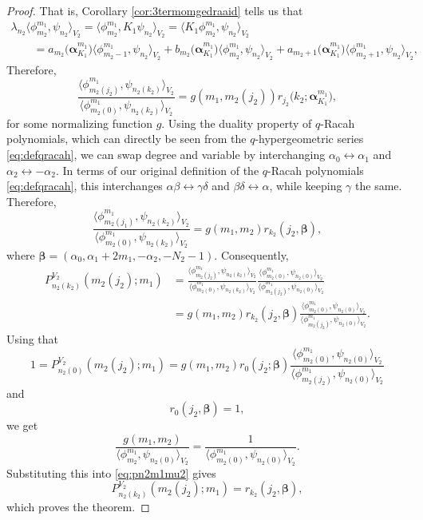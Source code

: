 \documentclass[10pt,a4paper]{amsart}
\numberwithin{equation}{section}
\begin{document}
\begin{proof}
	That is, Corollary \ref{cor:3termomgedraaid} tells us that
	\begin{gather*}
		\lambda_{n_2} \big\langle \phi_{m_2}^{m_1},\psi_{n_2}\big\rangle _{V_2} = \big\langle \phi_{m_2}^{m_1},K_1\psi_{n_2}\big\rangle _{V_2} = \big\langle K_1\phi_{m_2}^{m_1},\psi_{n_2}\big\rangle _{V_2} \\
		\qquad{} =a_{m_2}\big(\bm{\alpha}_{K_1}^{m_1}\big)\big\langle \phi_{m_2-1}^{m_1},\psi_{n_2}\big\rangle _{V_2}+b_{m_2}\big(\bm{\alpha}_{K_1}^{m_1}\big) \big\langle \phi_{m_2}^{m_1},\psi_{n_2}\big\rangle _{V_2}+a_{m_2+1}\big(\bm{\alpha}_{K_1}^{m_1}\big)\big\langle \phi_{m_2+1}^{m_1},\psi_{n_2}\big\rangle _{V_2},
	\end{gather*}
	Therefore,
	\[
	\frac{\big\langle \phi_{m_2(j_2)}^{m_1}, \psi_{n_2(k_2)}\big\rangle _{ V_2}}{\big\langle \phi_{m_2(0)}^{m_1}, \psi_{n_2(k_2)}\big\rangle _{ V_2}}=g(m_1,m_2(j_2))r_{j_2}\big(k_2;\bm{\alpha}_{K_1}^{m_1}\big),
	\]
for some normalizing function $g$. Using the duality property of $q$-Racah polynomials, which can directly be seen from the $q$-hypergeometric series \eqref{eq:defqracah}, we can swap degree and variable by interchanging $\alpha_0\leftrightarrow\alpha_1$ and $\alpha_2\leftrightarrow-\alpha_2$. In terms of our original definition of the $q$-Racah polynomials \eqref{eq:defqracah}, this interchanges $\alpha\beta\leftrightarrow\gamma\delta$ and $\beta\delta\leftrightarrow\alpha$, while keeping $\gamma$ the same. Therefore,
	\[
	\frac{\big\langle \phi_{m_2(j_1)}^{m_1}, \psi_{n_2(k_2)}\big\rangle _{ V_2}}{\big\langle \phi_{m_2(0)}^{m_1}, \psi_{n_2(k_2)}\big\rangle _{ V_2}}=g(m_1,m_2)r_{k_2}(j_2,\bm{\beta}),
	\]
	where $\bm{\beta}=(\alpha_0,\alpha_1+2m_1,-\alpha_2,-N_2-1)$. Consequently,
	\begin{align}
		P_{n_2(k_2)}^{V_2}(m_2(j_2);m_1)& = \frac{\big\langle \phi_{m_2(j_2)}^{m_1},\psi_{n_2(k_2)}\big\rangle _{ V_2}}{\big\langle \phi_{m_2(0)}^{m_1}, \psi_{n_2(k_2)}\big\rangle _{ V_2}}\frac{\big\langle \phi_{m_2(0)}^{m_1}, \psi_{n_2(0)}\big\rangle _{ V_2}}{\big\langle \phi_{m_2(j_2)}^{m_1}, \psi_{n_2(0)}\big\rangle _{ V_2}} \nonumber\\
		&= g(m_1,m_2)r_{k_2}(j_2,\bm{\beta})\frac{\big\langle \phi_{m_2(0)}^{m_1}, \psi_{n_2(0)}\big\rangle _{ V_2}}{\big\langle \phi_{m_2(j_2)}^{m_1}, \psi_{n_2(0)}\big\rangle _{ V_2}}.\label{eq:pn2m1mu2}
	\end{align}
	Using that
	\[
	1=P_{n_2(0)}^{V_2}(m_2(j_2);m_1)= g(m_1,m_2)r_{0}(j_2;\bm{\beta})\frac{\big\langle \phi_{m_2(0)}^{m_1}, \psi_{n_2(0)}\big\rangle _{ V_2}}{\big\langle \phi_{m_2(j_2)}^{m_1}, \psi_{n_2(0)}\big\rangle _{ V_2}}
	\]
	and
	\[
	r_{0}(j_2,\bm{\beta})=1,
	\]
	we get
	\[
	\frac{g(m_1,m_2)}{\big\langle \phi_{m_2}^{m_1}, \psi_{n_2(0)}\big\rangle _{ V_2}}=\frac{1}{\big\langle \phi_{m_2(0)}^{m_1}, \psi_{n_2(0)}\big\rangle _{ V_2}}.
	\]
	Substituting this into \eqref{eq:pn2m1mu2} gives
	\[
	P_{n_2(k_2)}^{V_2}(m_2(j_2);m_1)= r_{k_2}(j_2,\bm{\beta}) ,
	\]
	which proves the theorem.
\end{proof}
\end{document}
